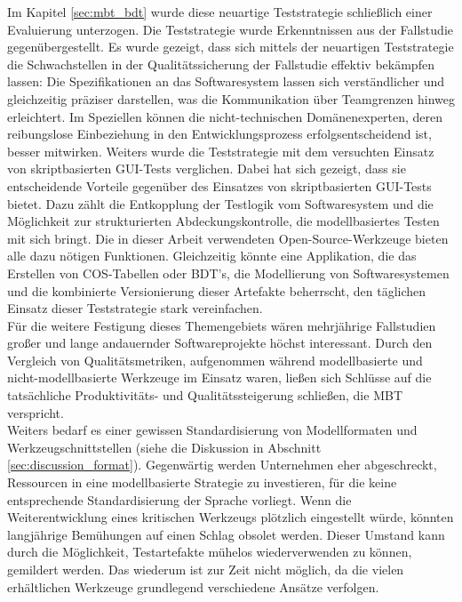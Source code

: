 Im Kapitel \ref{sec:mbt_bdt} wurde diese neuartige Teststrategie schließlich einer Evaluierung unterzogen. Die Teststrategie wurde Erkenntnissen aus der Fallstudie gegenübergestellt. Es wurde gezeigt, dass sich mittels der neuartigen Teststrategie die Schwachstellen in der Qualitätssicherung der Fallstudie effektiv bekämpfen lassen: Die Spezifikationen an das Softwaresystem lassen sich verständlicher und gleichzeitig präziser darstellen, was die Kommunikation über Teamgrenzen hinweg erleichtert. Im Speziellen können die nicht-technischen Domänenexperten, deren reibungslose Einbeziehung in den Entwicklungsprozess erfolgsentscheidend ist, besser mitwirken. Weiters wurde die Teststrategie mit dem versuchten Einsatz von skriptbasierten GUI-Tests verglichen. Dabei hat sich gezeigt, dass sie entscheidende Vorteile gegenüber des Einsatzes von skriptbasierten GUI-Tests bietet. Dazu zählt die Entkopplung der Testlogik vom Softwaresystem und die Möglichkeit zur strukturierten Abdeckungskontrolle, die modellbasiertes Testen mit sich bringt. Die in dieser Arbeit verwendeten Open-Source-Werkzeuge bieten alle dazu nötigen Funktionen. Gleichzeitig könnte eine Applikation, die das Erstellen von \Gls{COS}-Tabellen oder \Gls{BDT}'s, die Modellierung von Softwaresystemen und die kombinierte Versionierung dieser Artefakte beherrscht, den täglichen Einsatz dieser Teststrategie stark vereinfachen.\\

Für die weitere Festigung dieses Themengebiets wären mehrjährige Fallstudien großer und lange andauernder Softwareprojekte höchst interessant. Durch den Vergleich von Qualitätsmetriken, aufgenommen während modellbasierte und nicht-modellbasierte Werkzeuge im Einsatz waren, ließen sich Schlüsse auf die tatsächliche Produktivitäts- und Qualitätssteigerung schließen, die \Gls{MBT} verspricht.\\
Weiters bedarf es einer gewissen Standardisierung von Modellformaten und Werkzeugschnittstellen (siehe die Diskussion in Abschnitt \ref{sec:discussion_format}). Gegenwärtig werden Unternehmen eher abgeschreckt, Ressourcen in eine modellbasierte Strategie zu investieren, für die keine entsprechende Standardisierung der Sprache vorliegt. Wenn die Weiterentwicklung eines kritischen Werkzeugs plötzlich eingestellt würde, könnten langjährige Bemühungen auf einen Schlag obsolet werden. Dieser Umstand kann durch die Möglichkeit, Testartefakte mühelos wiederverwenden zu können, gemildert werden. Das wiederum ist zur Zeit nicht möglich, da die vielen erhältlichen Werkzeuge grundlegend verschiedene Ansätze verfolgen.



























